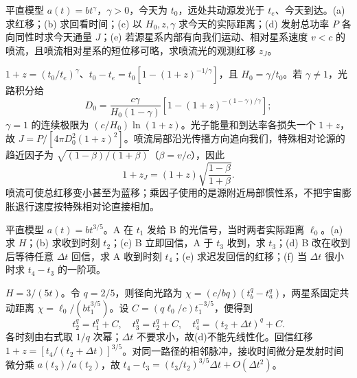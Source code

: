\begin{exercise}
平直模型 $a(t)=bt^\gamma$，$\gamma>0$，今天为 $t_0$，远处共动源发光于 $t_e$、今天到达。(a) 求红移；(b) 求回看时间；(c) 以 $H_0,z,\gamma$ 求今天的实际距离；(d) 发射总功率 $P$ 各向同性时求今天通量 $J$；(e) 若源星系内部有向我们运动、相对星系速度 $v<c$ 的喷流，且喷流相对星系的短位移可略，求喷流光的观测红移 $z_J$。
\end{exercise}
\begin{solution}
$1+z=(t_0/t_e)^\gamma$、$t_0-t_e=t_0[1-(1+z)^{-1/\gamma}]$，且 $H_0=\gamma/t_0$。若 $\gamma\ne1$，光路积分给
\[
D_0=\frac{c\gamma}{H_0(1-\gamma)}
\left[1-(1+z)^{-(1-\gamma)/\gamma}\right];
\]
$\gamma=1$ 的连续极限为 $(c/H_0)\ln(1+z)$。光子能量和到达率各损失一个 $1+z$，故 $J=P/[4\pi D_0^2(1+z)^2]$。喷流局部沿光传播方向追向我们，特殊相对论源的趋近因子为 $\sqrt{(1-\beta)/(1+\beta)}$（$\beta=v/c$），因此
\[
1+z_J=(1+z)\sqrt{\frac{1-\beta}{1+\beta}}.
\]
喷流可使总红移变小甚至为蓝移；乘因子使用的是源附近局部惯性系，不把宇宙膨胀退行速度按特殊相对论直接相加。
\end{solution}

\begin{exercise}
平直模型 $a(t)=bt^{3/5}$。A 在 $t_1$ 发给 B 的光信号，当时两者实际距离 $\ell_0$。(a) 求 $H$；(b) 求收到时刻 $t_2$；(c) B 立即回信，A 于 $t_3$ 收到，求 $t_3$；(d) B 改在收到后等待任意 $\Delta t$ 回信，求 A 收到时刻 $t_4$；(e) 求迟发回信的红移；(f) 当 $\Delta t$ 很小时求 $t_4-t_3$ 的一阶项。
\end{exercise}
\begin{solution}
$H=3/(5t)$。令 $q=2/5$，则径向光路为 $\chi=(c/bq)(t_b^q-t_a^q)$，两星系固定共动距离 $\chi=\ell_0/(bt_1^{3/5})$。设 $C=(q\ell_0/c)t_1^{-3/5}$，便得到
\[
t_2^q=t_1^q+C,\quad t_3^q=t_2^q+C,\quad
t_4^q=(t_2+\Delta t)^q+C.
\]
各时刻由右式取 $1/q$ 次幂；$\Delta t$ 不要求小，故(d)不能先线性化。回信红移 $1+z=[t_4/(t_2+\Delta t)]^{3/5}$。对同一路径的相邻脉冲，接收时间微分是发射时间微分乘 $a(t_3)/a(t_2)$，故
$t_4-t_3=(t_3/t_2)^{3/5}\Delta t+O(\Delta t^2)$。
\end{solution}

